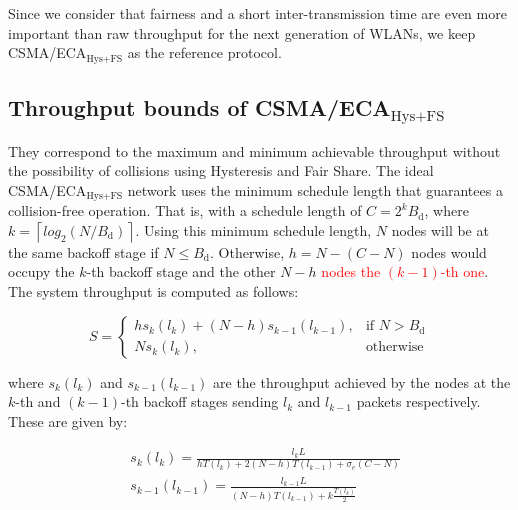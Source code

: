 	
	Since we consider that fairness and a short inter-transmission time are even more important than raw throughput for the next generation of WLANs, we keep CSMA/ECA$_{\text{Hys+FS}}$ as the reference protocol.
	
	\subsection{Throughput bounds of CSMA/ECA$_{\text{Hys+FS}}$}\label{ECA-bounds}
	
	They correspond to the maximum and minimum achievable throughput without the possibility of collisions using Hysteresis and Fair Share. The ideal CSMA/ECA$_{\text{Hys+FS}}$ network uses the minimum schedule length that guarantees a collision-free operation. That is, with a schedule length of $C=2^{k}B_{\text{d}}$, where $k = \left\lceil log_{2}(N/B_{\text{d}})\right\rceil$. Using this minimum schedule length, $N$ nodes will be at the same backoff stage if $N\leq B_{\text{d}}$. Otherwise, $h = N-(C-N)$ nodes would occupy the $k$-th backoff stage and the other $N-h$ \textcolor{red}{nodes the $(k-1)$-th one}. The system throughput is computed as follows:
	
	\begin{equation}
			S =
				\begin{cases}\label{eq:bound}
					hs_{k}(l_{k}) + (N-h)s_{k-1}(l_{k-1}), & \text{if } N > B_{\text{d}} \\
					Ns_{k}(l_{k}), & \text{otherwise}
				\end{cases}
	\end{equation}
	
	where $s_{k}(l_{k})$ and $s_{k-1}(l_{k-1})$ are the throughput achieved by the nodes at the $k$-th and $(k-1)$-th backoff stages sending $l_{k}$ and $l_{k-1}$ packets respectively. These are given by:
	
	\begin{subequations}
		\begin{align}
			&s_{k}(l_{k}) = \frac{l_{k} L}{hT(l_{k})+2(N-h)T(l_{k-1}) + \sigma_{e}(C - N)}\label{eq:HighNodes}\\
			&s_{k-1}(l_{k-1}) = \frac{l_{k-1} L}{(N-h)T(l_{k-1}) + k\frac{T(l_{k})}{2}}\label{eq:LowNodes}
		\end{align}
	\end{subequations}
	
